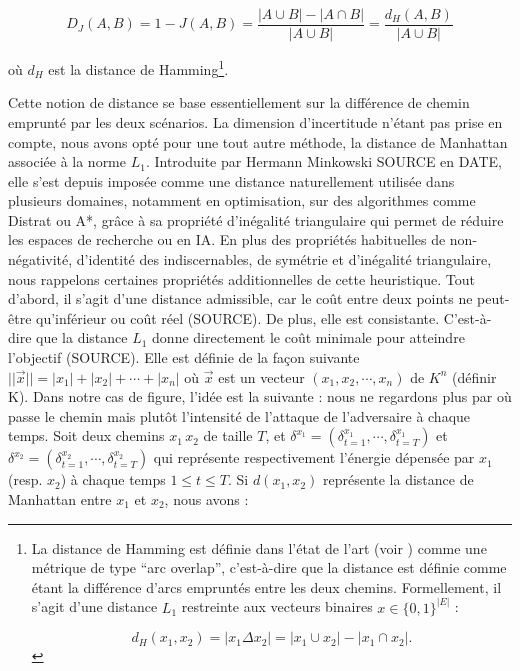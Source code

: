 \documentclass[12pt, a4paper, twoside]{report}
\numberwithin{equation}{section}
\begin{document}
\begin{Figure}[H]
	\begin{equation}
		D_J(A, B)
		= 1 - J(A, B)
		= \frac{|A \cup B| - |A \cap B|}{|A \cup B|}
		= \frac{d_H(A, B)}{|A \cup B|}
	\end{equation}
	
	\noindent où \(d_H\) est la distance de Hamming\footnote{La distance de Hamming est définie dans l'état de l'art (voir \cite{hamming_dist_scheduling_prbl}) comme une métrique de type \enquote{arc overlap}, c'est-à-dire que la distance est définie comme étant la différence d'arcs empruntés entre les deux chemins. Formellement, il s'agit d'une distance $L_1$ restreinte aux vecteurs binaires $x\in\{0, 1\}^{|E|}$ :
		
		\[
		d_H(x_1,x_2)=|x_1\Delta x_2|=|x_1\cup x_2|-|x_1\cap x_2|.
		\]
	}.
	
	Cette notion de distance se base essentiellement sur la différence de chemin emprunté par les deux scénarios. La dimension d'incertitude n'étant pas prise en compte, nous avons opté pour une tout autre méthode, la distance de Manhattan associée à la norme $L_1$. Introduite par Hermann Minkowski SOURCE en DATE, elle s'est depuis imposée comme une distance naturellement utilisée dans plusieurs domaines, notamment en optimisation, sur des algorithmes comme Distrat ou A*, grâce à sa propriété d'inégalité triangulaire qui permet de réduire les espaces de recherche ou en IA. En plus des propriétés habituelles de non-négativité, d’identité des indiscernables, de symétrie et d'inégalité triangulaire, nous rappelons certaines propriétés additionnelles de cette heuristique. Tout d'abord, il s'agit d'une distance admissible, car le coût entre deux points ne peut-être qu'inférieur ou coût réel (SOURCE). De plus, elle est consistante. C'est-à-dire que la distance $L_1$ donne directement le coût minimale pour atteindre l'objectif (SOURCE). Elle est définie de la façon suivante $||\Vec{x}||=|x_1|+|x_2|+\cdots+|x_n|$ où $\Vec{x}$ est un vecteur $(x_1, x_2, \cdots, x_n)$ de $K^n$ (définir K). Dans notre cas de figure, l'idée est la suivante : nous ne regardons plus par où passe le chemin mais plutôt l'intensité de l'attaque de l'adversaire à chaque temps. Soit deux chemins $x_1\, x_2$ de taille $T$, et $\delta^{x_1}=(\delta_{t=1}^{x_1}, \cdots, \delta_{t=T}^{x_1})$ et $\delta^{x_2}=(\delta_{t=1}^{x_2}, \cdots, \delta_{t=T}^{x_2})$ qui représente respectivement l'énergie dépensée par $x_1$ (resp. $x_2$) à chaque temps $1\leq t\leq T$. Si $d(x_1, x_2)$ représente la distance de Manhattan entre $x_1$ et $x_2$, nous avons :


\end{Figure}
\end{document}
